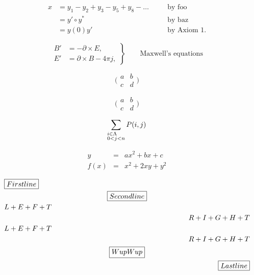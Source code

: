 \documentclass{article}
\newcommand{\horz}{\noindent\makebox[\linewidth]{\rule{\paperwidth}{0.4pt}}}
\begin{document}
\begin{spreadlines}{30pt}
  \begin{alignat}{2}
  x& = y_1-y_2+y_3-y_5+y_8-\dots
  &\quad& \text{by foo}\\
  & = y'\circ y^*  && \text{by baz}\\
  & = y(0) y'      && \text {by Axiom 1.}
  \end{alignat}

  \begin{equation*}
  \left.\begin{aligned}
  B'&=-\partial\times E,\\
  E'&=\partial\times B - 4\pi j,
  \end{aligned}
  \right\}
  \qquad \text{Maxwell's equations}
  \end{equation*}

  \[
  \bigl( \begin{smallmatrix}
  a&b\\ c&d
  \end{smallmatrix} \bigr)
  \]

  \[
  \bigl( \begin{smallmatrix*}
  a&b\\ c&d
  \end{smallmatrix*} \bigr)
  \]

  \[
  \sum_{\begin{subarray}{l}
  i\in\Lambda\\ 0<j<n
  \end{subarray}}
  P(i,j)
  \]

  \begin{eqnarray}
       y & = & ax^2 + bx + c \\
    f(x) & = & x^2 + 2xy + y^2
  \end{eqnarray}
\end{spreadlines}

\horz

\[
  \begin{multlined}[c][\textwidth]
    \boxed{First line}     \\
    \boxed{Second line}    \\
    \shoveleft{L+E+F+T}    \\
    \shoveright{R+I+G+H+T} \\
    \shoveleft{L+E+F+T}    \\
    \shoveright{R+I+G+H+T} \\
    \boxed{Wup Wup}    \\
    \boxed{Last line}
  \end{multlined}
\]

\horz
\end{document}

